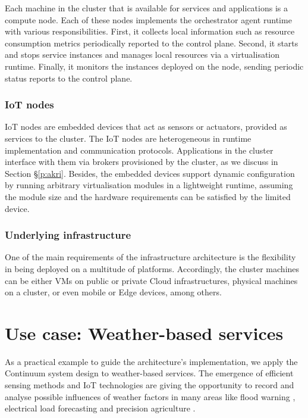 Each machine in the cluster that is available for services and applications is a compute node. Each of these nodes implements the orchestrator agent runtime with various responsibilities. First, it collects local information such as resource consumption metrics periodically reported to the control plane. Second, it starts and stops service instances and manages local resources via a virtualisation runtime. Finally, it monitors the instances deployed on the node, sending periodic status reports to the control plane.

\subsubsection{IoT nodes}

IoT nodes are embedded devices that act as sensors or actuators, provided as services to the cluster. The IoT nodes are heterogeneous in runtime implementation and communication protocols. Applications in the cluster interface with them via brokers provisioned by the cluster, as we discuss in Section §\ref{p:akri}. Besides, the embedded devices support dynamic configuration by running arbitrary virtualisation modules in a lightweight runtime, assuming the module size and the hardware requirements can be satisfied by the limited device.

\subsubsection{Underlying infrastructure}

One of the main requirements of the infrastructure architecture is the flexibility in being deployed on a multitude of platforms. Accordingly, the cluster machines can be either VMs on public or private Cloud infrastructures, physical machines on a cluster, or even mobile or Edge devices, among others.

\section{Use case: Weather-based services}\label{sec:uc}

As a practical example to guide the architecture's implementation, we apply the Continuum system design to weather-based services. The emergence of efficient sensing methods and IoT technologies are giving the opportunity to record and analyse possible influences of weather factors in many areas like flood warning \cite{brzoza2016embedded}, electrical load forecasting \cite{weather-load-forecasting} and precision agriculture \cite{keswani2019adapting}.

